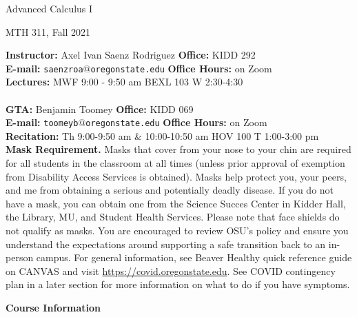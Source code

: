 \documentclass{article}
\begin{document}
\begin{center}
\begin{Large}
Advanced Calculus I
\end{Large}

\begin{large}
MTH 311, Fall 2021
\end{large}
\end{center}

\bigskip

\noindent \textbf{Instructor:} Axel Ivan Saenz Rodriguez \hfill \textbf{Office:} KIDD 292\\
\noindent \textbf{E-mail:} \texttt{saenzroa$@$oregonstate.edu} \hfill \textbf{Office Hours:} on Zoom\\
\noindent \textbf{Lectures:} MWF 9:00 - 9:50 am BEXL 103  \hfill  W 2:30-4:30 \\
\vspace{1mm}\\
\noindent \textbf{GTA:} Benjamin Toomey \hfill \textbf{Office:} KIDD 069\\
\noindent \textbf{E-mail:} \texttt{toomeyb$@$oregonstate.edu} \hfill \textbf{Office Hours:} on Zoom \\
\noindent \textbf{Recitation:} Th 9:00-9:50 am \& 10:00-10:50 am HOV 100 \hfill T 1:00-3:00 pm\\

\noindent \textbf{Mask Requirement.} Masks that cover from your nose to your chin are required for all students in the classroom at all times (unless prior approval of exemption from Disability Access Services is obtained). Masks help protect you, your peers, and me from obtaining a serious and potentially deadly disease. If you do not have a mask, you can obtain one from the Science Succes Center in Kidder Hall, the Library, MU, and Student Health Services. Please note that face shields do not qualify as masks. You are encouraged to review OSU’s policy and ensure you understand the expectations around supporting a safe transition back to an in-person campus. For general information, see Beaver Healthy quick reference guide on CANVAS and visit \href{https://covid.oregonstate.edu}{https://covid.oregonstate.edu}. See COVID contingency plan in a later section for more information on what to do if you have symptoms.

\bigskip

\begin{large}
\noindent \textbf{Course Information}
\end{large}
\end{document}
